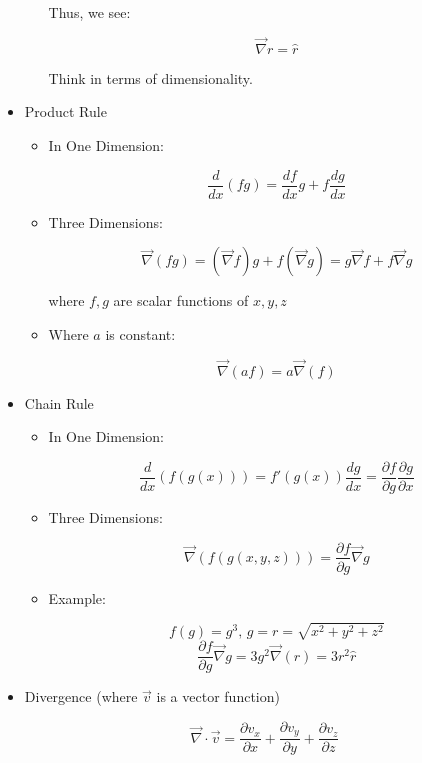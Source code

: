 \begin{itemize}
\begin{itemize}
        Thus, we see:

        $$\vec{\nabla}r=\hat{r}$$

        Think in terms of dimensionality.

    \end{itemize}

  \item Product Rule

    \begin{itemize}

      \item In One Dimension:

        $$\frac{d}{dx}(fg)=\frac{df}{dx}g+f\frac{dg}{dx}$$

      \item Three Dimensions:

        $$\vec{\nabla}(fg)=(\vec{\nabla}f)g+f(\vec{\nabla}g)=g\vec{\nabla}f+f\vec{\nabla}g$$

        where $f,g$ are scalar functions of $x,y,z$

      \item Where $a$ is constant:

        $$\vec{\nabla}(af)=a\vec{\nabla}(f)$$

    \end{itemize}

  \item Chain Rule

    \begin{itemize}

      \item In One Dimension:

        $$\frac{d}{dx}(f(g(x)))=f'(g(x))\frac{dg}{dx}=\frac{\partial f}{\partial g}\frac{\partial g}{\partial x}$$

      \item Three Dimensions:

        $$\vec{\nabla}(f(g(x,y,z)))=\frac{\partial f}{\partial g}\vec{\nabla}g$$

      \item Example:

        $$f(g)=g^3,\,g=r=\sqrt{x^2+y^2+z^2}$$
        $$\frac{\partial f}{\partial g}\vec{\nabla}g=3g^2\vec{\nabla}(r)=3r^2\hat{r}$$

    \end{itemize}

  \item Divergence (where $\vec{v}$ is a vector function)

      $$\vec{\nabla}\cdot\vec{v}=\frac{\partial v_x}{\partial x}+\frac{\partial v_y}{\partial y}+\frac{\partial v_z}{\partial z}$$


\end{itemize}
